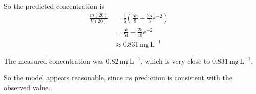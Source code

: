 \documentclass[leqno]{article}
\begin{document}
\begin{enumerate}[
  label=\textbf{\arabic*.},
  leftmargin=*,
  topsep=0pt,
  partopsep=0pt,
  parsep=0pt
]
\begin{djsSolution}
\begin{enumerate}[label=\textbf{(\alph*)}]
So the predicted concentration is
\begin{align*}
\frac{m(20)}{V(20)}
&=\frac{1}{6}\left(\frac{55}{9}-\frac{25}{3}e^{-2}\right) \\
&=\frac{55}{54}-\frac{25}{18}e^{-2} \\
&\approx 0.831\,\mathrm{mg\,L^{-1}}
\end{align*}

The measured concentration was \(0.82\,\mathrm{mg\,L^{-1}}\), which is very close to \(0.831\,\mathrm{mg\,L^{-1}}\).

So the model appears reasonable, since its prediction is consistent with the observed value.
\end{enumerate}
\end{djsSolution}


\newpage

\questionitem


\end{enumerate}
\end{document}
